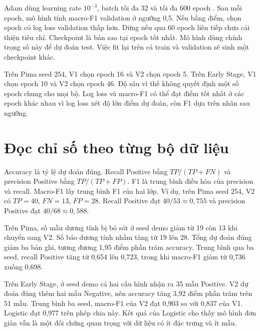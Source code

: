 Adam dùng learning rate \(10^{-3}\), batch tối đa 32 và tối đa 600 epoch \cite{mlp-v2}. Sau mỗi epoch, mô hình tính macro-F1 validation ở ngưỡng 0,5. Nếu bằng điểm, chọn epoch có log loss validation thấp hơn. Dừng nếu qua 60 epoch liên tiếp chưa cải thiện tiêu chí. Checkpoint là bản sao tại epoch tốt nhất. Mô hình dùng chính trọng số này để dự đoán test. Việc fit lại trên cả train và validation sẽ sinh một checkpoint khác.



Trên Pima seed 254, V1 chọn epoch 16 và V2 chọn epoch 5. Trên Early Stage, V1 chọn epoch 10 và V2 chọn epoch 46. Độ sâu vì thế không quyết định một số epoch chung cho mọi bộ. Log loss và macro-F1 có thể đạt điểm tốt nhất ở các epoch khác nhau vì log loss xét độ lớn điểm dự đoán, còn F1 dựa trên nhãn sau ngưỡng.

\section{Đọc chỉ số theo từng bộ dữ liệu}
Accuracy là tỷ lệ dự đoán đúng. Recall Positive bằng \(TP/(TP+FN)\) và precision Positive bằng \(TP/(TP+FP)\). F1 là trung bình điều hòa của precision và recall. Macro-F1 lấy trung bình F1 của hai lớp. Ví dụ, trên Pima seed 254, V2 có \(TP=40\), \(FN=13\), \(FP=28\). Recall Positive đạt \(40/53\approx0{,}755\) và precision Positive đạt \(40/68\approx0{,}588\).





Trên Pima, số mẫu dương tính bị bỏ sót ở seed demo giảm từ 19 còn 13 khi chuyển sang V2. Số báo dương tính nhầm tăng từ 19 lên 28. Tổng dự đoán đúng giảm ba bản ghi, tương đương 1,95 điểm phần trăm accuracy. Trung bình qua ba seed, recall Positive tăng từ 0,654 lên 0,723, trong khi macro-F1 giảm từ 0,736 xuống 0,698.

Trên Early Stage, ở seed demo cả hai cấu hình nhận ra 35 mẫu Positive. V2 dự đoán đúng thêm hai mẫu Negative, nên accuracy tăng 3,92 điểm phần trăm trên 51 mẫu. Trung bình ba seed, macro-F1 của V2 đạt 0,903 so với 0,837 của V1. Logistic đạt 0,977 trên phép chia này. Kết quả của Logistic cho thấy mô hình đơn giản vẫn là một đối chứng quan trọng với dữ liệu có ít đặc trưng và ít mẫu.

